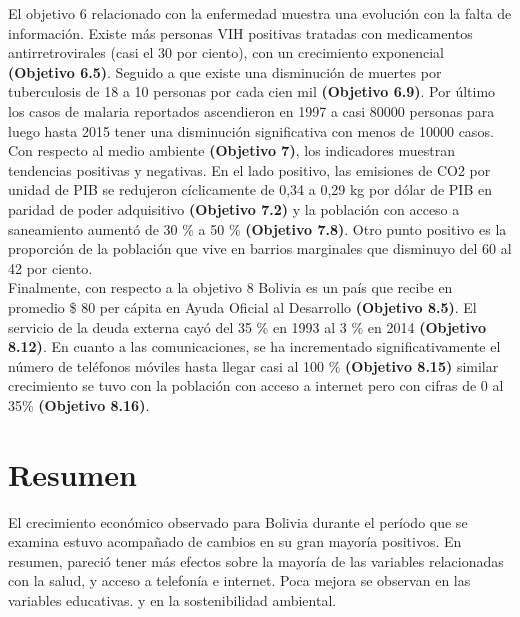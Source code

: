 El objetivo 6 relacionado con la enfermedad muestra una evolución  con la falta de información. Existe  más personas VIH positivas tratadas con medicamentos antirretrovirales (casi el 30 por ciento), con un crecimiento  exponencial \textbf{(Objetivo 6.5)}. Seguido a que existe una disminución de muertes por tuberculosis de 18 a 10 personas por cada cien mil \textbf{(Objetivo 6.9)}. Por último los casos de malaria reportados ascendieron en 1997 a casi 80000 personas para luego hasta 2015 tener una disminución significativa con menos de 10000 casos.\\
Con respecto al medio ambiente \textbf{(Objetivo 7)}, los indicadores muestran tendencias positivas y negativas. En el lado positivo, las emisiones de CO2 por unidad de PIB se redujeron cíclicamente de 0,34 a 0,29 kg por dólar de PIB en paridad de poder adquisitivo \textbf{(Objetivo 7.2)} y la población con acceso a saneamiento aumentó de 30 \% a 50 \% \textbf{(Objetivo 7.8)}. Otro punto positivo es la proporción de la población que vive en barrios marginales que disminuyo del 60 al 42 por ciento.\\
Finalmente, con respecto a la objetivo 8 Bolivia es un país que recibe en promedio  \$ 80 per cápita en Ayuda Oficial al Desarrollo \textbf{(Objetivo 8.5)}. El servicio de la deuda externa cayó del 35 \% en 1993 al 3 \% en 2014 \textbf{(Objetivo 8.12)}. En cuanto a las comunicaciones, se ha incrementado significativamente el número de teléfonos móviles hasta llegar casi al 100 \% \textbf{(Objetivo 8.15)} similar crecimiento se tuvo con la población con acceso a internet pero con cifras de 0 al 35\% \textbf{(Objetivo 8.16)}. 


\section{Resumen}
El crecimiento económico observado para Bolivia durante el período que se examina estuvo acompañado de cambios en su gran mayoría positivos. En resumen, pareció tener más efectos sobre la mayoría de las variables relacionadas con la salud, y acceso a telefonía e internet.  Poca mejora se  observan  en las variables educativas.  y en la sostenibilidad ambiental.




